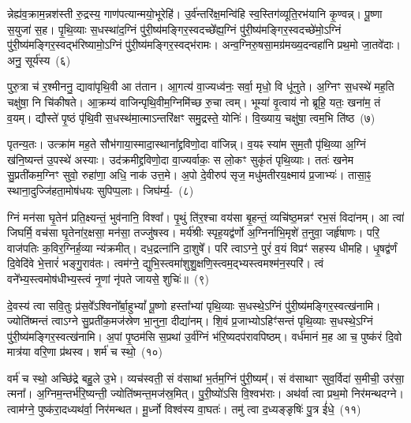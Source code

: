 न्नेह्य॑व॒क्राम॒न्नश॑स्ती रु॒द्रस्य॒ गाण॑पत्यान्मयो॒भूरेहि॑। उ॒र्व॑न्तरि॑क्ष॒\-मन्वि॑हि स्व॒स्तिग॑व्यूति॒\-रभ॑यानि कृ॒ण्वन्न्। पू॒ष्णा स॒युजा॑ स॒ह। पृ॒थि॒व्याः स॒धस्था॑द॒ग्निं पु॑री॒ष्य॑मङ्गिर॒\-स्वदच्छे᳚ह्य॒ग्निं पु॑री॒ष्य॑मङ्गिर॒\-स्वदच्छे॑मो॒\-ऽग्निं पु॑री॒ष्य॑मङ्गिर॒\-स्वद्भ॑रिष्यामो॒\-ऽग्निं पु॑री॒ष्य॑मङ्गिर॒\-स्वद्भ॑रामः। अन्व॒ग्निरु॒षसा॒मग्र॑मख्य॒दन्वहा॑नि प्रथ॒मो जा॒तवे॑दाः। अनु॒ सूर्य॑स्य~(६)

पुरु॒त्रा च॑ र॒श्मीननु॒ द्यावा॑\-पृथि॒वी आ त॑तान। आ॒गत्य॑ वा॒ज्यध्व॑नः॒ सर्वा॒ मृधो॒ वि धू॑नुते। अ॒ग्निꣳ स॒धस्थे॑ मह॒ति चक्षु॑षा॒ नि चि॑कीषते। आ॒क्रम्य॑ वाजिन्पृथि॒वीम॒ग्निमि॑च्छ रु॒चा त्वम्। भूम्या॑ वृ॒त्वाय॑ नो ब्रूहि॒ यतः॒ खना॑म॒ तं व॒यम्। द्यौस्ते॑ पृ॒ष्ठं पृ॑थि॒वी स॒धस्थ॑मा॒त्माऽन्तरि॑क्षꣳ समु॒द्रस्ते॒ योनिः॑। वि॒ख्याय॒ चक्षु॑षा॒ त्वम॒भि ति॑ष्ठ~(७)

पृतन्य॒तः। उत्क्रा॑म मह॒ते सौभ॑गाया॒स्मादा॒स्थाना᳚द्द्रविणो॒दा वा॑जिन्न्। व॒यꣴ स्या॑म सुम॒तौ पृ॑थि॒व्या अ॒ग्निं ख॑नि॒ष्यन्त॑ उ॒पस्थे॑ अस्याः। उद॑क्रमीद्द्रविणो॒दा वा॒ज्यर्वाकः॒ स लो॒कꣳ सुकृ॑तं पृथि॒व्याः। ततः॑ खनेम सु॒प्रती॑कम॒ग्निꣳ सुवो॒ रुहा॑णा॒ अधि॒ नाक॑ उत्त॒मे। अ॒पो दे॒वीरुप॑ सृज॒ मधु॑मतीरय॒क्ष्माय॑ प्र॒जाभ्यः॑। तासा॒ꣴ॒ स्थाना॒दुज्जि॑हता॒मोष॑धयः सुपिप्प॒लाः। जिघ॑र्म्य॒-~(८)

ग्निं मन॑सा घृ॒तेन॑ प्रति॒क्ष्यन्तं॒ भुव॑नानि॒ विश्वा᳚। पृ॒थुं ति॑र॒श्चा वय॑सा बृ॒हन्तं॒ व्यचि॑ष्ठ॒मन्नꣳ॑ रभ॒सं विदा॑नम्। आ त्वा॑ जिघर्मि॒ वच॑सा घृ॒तेना॑र॒क्षसा॒ मन॑सा॒ तज्जु॑षस्व। मर्य॑श्रीः स्पृह॒यद्व॑र्णो अ॒ग्निर्नाभि॒मृशे॑ त॒नुवा॒ जर्\mbox{}हृ॑षाणः। परि॒ वाज॑पतिः क॒विर॒ग्निर्\mbox{}ह॒व्या न्य॑क्रमीत्। दध॒द्रत्ना॑नि दा॒शुषे᳚। परि॑ त्वा\-ऽग्ने॒ पुरं॑ व॒यं विप्रꣳ॑ सहस्य धीमहि। धृ॒षद्व॑र्णं दि॒वेदि॑वे भे॒त्तारं॑ भङ्गु॒राव॑तः। त्वम॑ग्ने॒ द्युभि॒स्त्वमा॑शुशु॒क्षणि॒स्त्वम॒द्भ्यस्त्वमश्म॑न॒स्परि॑। त्वं वने᳚भ्य॒स्त्वमोष॑धीभ्य॒स्त्वं नृ॒णां नृ॑पते जायसे॒ शुचिः॑॥~(९)

{\anuvakamend[{प्र॒तूर्व॒न्थ्सूर्य॑स्य तिष्ठ॒ जिघ॑र्मि भे॒त्तारं॑ विꣳश॒तिश्च॑}]}%

दे॒वस्य॑ त्वा सवि॒तुः प्र॑स॒वे᳚\-ऽश्विनो᳚र्बा॒हु\-भ्यां᳚ पू॒ष्णो हस्ता᳚भ्यां पृथि॒व्याः स॒धस्थे॒\-ऽग्निं पु॑री॒ष्य॑मङ्गिर॒\-स्व\-त्ख॑नामि। ज्योति॑ष्मन्तं त्वाऽग्ने सु॒प्रती॑क॒मज॑स्रेण भा॒नुना॒ दीद्या॑नम्। शि॒वं प्र॒जाभ्यो\-ऽहिꣳ॑सन्तं पृथि॒व्याः स॒धस्थे॒\-ऽग्निं पु॑री॒ष्य॑मङ्गिर॒\-स्वत्ख॑नामि। अ॒पां पृ॒ष्ठम॑सि स॒प्रथा॑ उ॒र्व॑ग्निं भ॑रि॒ष्यदप॑रावपिष्ठम्। वर्ध॑मानं म॒ह आ च॒ पुष्क॑रं दि॒वो मात्र॑या वरि॒णा प्र॑थस्व। शर्म॑ च स्थो॒~(१०)

वर्म॑ च स्थो॒ अच्छि॑द्रे बहु॒ले उ॒भे। व्यच॑स्वती॒ सं व॑साथां भ॒र्तम॒ग्निं पु॑री॒ष्यम्᳚। सं व॑साथाꣳ सुव॒र्विदा॑ स॒मीची॒ उर॑सा॒ त्मना᳚। अ॒ग्निम॒न्तर्भ॑रि॒ष्यन्ती॒ ज्योति॑ष्मन्त॒मज॑स्र॒मित्। पु॒री॒ष्यो॑\-ऽसि वि॒श्वभ॑राः। अथ॑र्वा त्वा प्रथ॒मो निर॑मन्थदग्ने। त्वाम॑ग्ने॒ पुष्क॑रा॒दध्यथ॑र्वा॒ निर॑मन्थत। मू॒र्ध्नो विश्व॑स्य वा॒घतः॑। तमु॑ त्वा द॒ध्यङ्ङृषिः॑ पु॒त्र ई॑धे॒~(११)

